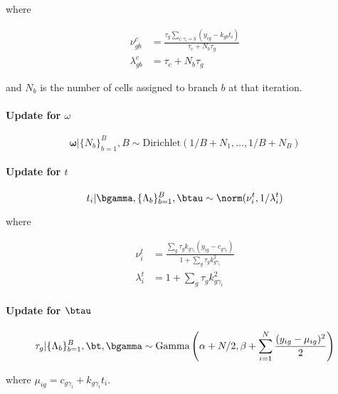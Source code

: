 where

\begin{equation}
\begin{aligned}
\nu^c_{gb} & = \frac{\tau_g \sum_{i:\gamma_i = b} (y_{ig} - k_{gb} t_i)}{\tau_c + N_b \tau_g}\\
\lambda^c_{gb} & = \tau_c + N_b \tau_g
\end{aligned}
\end{equation}

and $N_b$ is the number of cells assigned to branch $b$ at that iteration.

\paragraph{Update for $\omega$}

\begin{equation}
  \bm \omega | \{N_b\}_{b=1}^B, B \sim \text{Dirichlet}(1/B + N_1, \ldots, 1/B + N_B)
\end{equation}

\paragraph{Update for $t$}

\begin{equation}
  t_i | \bgamma, \{ \Lambda_b \}_{b=1}^B, \btau \sim \norm(\nu^t_i, 1 / \lambda^t_i)
\end{equation}

where

\begin{equation}
\begin{aligned}
\nu^t_{i} & = \frac{\sum_g \tau_g k_{g\gamma_i} (y_{ig} - c_{g\gamma_i})}
{1 + \sum_g \tau_g k_{g\gamma_i}^2} \\
\lambda^t_{i} & = 1 + \sum_g \tau_g k_{g\gamma_i}^2
\end{aligned}
\end{equation}

\paragraph{Update for $\btau$}

\begin{equation}
\tau_g |  \{ \Lambda_b \}_{b=1}^B, \bt, \bgamma \sim \text{Gamma}\left( \alpha + N / 2,
\beta + \sum_{i=1}^N \frac{(y_{ig} - \mu_{ig})^2}{2}
\right)
\end{equation}

where $\mu_{ig} = c_{g\gamma_i} + k_{g\gamma_i} t_i$.

